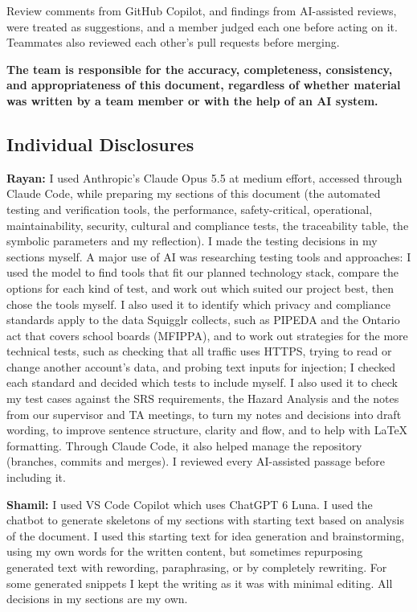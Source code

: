 \documentclass[12pt, titlepage]{article}
\begin{document}
Review comments from GitHub Copilot, and findings from AI-assisted reviews,
were treated as suggestions, and a member judged each one before acting on it.
Teammates also reviewed each other's pull requests before merging.

\textbf{The team is responsible for the accuracy, completeness,
consistency, and appropriateness of this document, regardless of whether
material was written by a team member or with the help of an AI system.}

\subsection*{Individual Disclosures}

\noindent\hspace{\parindent}\textbf{Rayan:} I used Anthropic's Claude Opus 5.5 at medium effort, accessed
through Claude Code, while preparing my sections of this document (the
automated testing and verification tools, the performance, safety-critical,
operational, maintainability, security, cultural and compliance tests, the
traceability table, the symbolic parameters and my reflection). I made the
testing decisions in my sections myself. A major use of AI was researching
testing tools and approaches: I used the model to find tools that fit our
planned technology stack, compare the options for each kind of test, and
work out which suited our project best, then chose the tools myself. I also
used it to identify which privacy and compliance standards apply to the data
Squigglr collects, such as PIPEDA and the Ontario act that covers school
boards (MFIPPA), and to work out strategies for the more technical tests, such
as checking that all traffic uses HTTPS, trying to read or change another
account's data, and probing text inputs for injection; I checked each standard
and decided which tests to include myself. I also used it to check my test cases against the SRS requirements, the Hazard
Analysis and the notes from our supervisor and TA meetings, to turn my notes
and decisions into draft wording, to improve sentence structure, clarity and
flow, and to help with \LaTeX{} formatting. Through Claude Code, it also
helped manage the repository (branches, commits and merges). I reviewed every
AI-assisted passage before including it.

\textbf{Shamil:} I used VS Code Copilot which uses ChatGPT 6 Luna. 
I used the chatbot to generate skeletons of my sections with starting text based 
on analysis of the document. I used this starting text for idea generation and 
brainstorming, using my own words for the written content, but sometimes repurposing 
generated text with rewording, paraphrasing, or by completely rewriting. For 
some generated snippets I kept the writing as it was with minimal editing. All 
decisions in my sections are my own.
\end{document}
